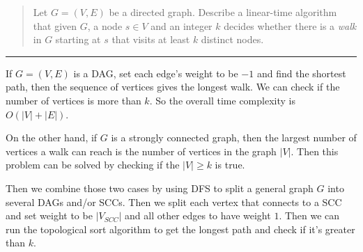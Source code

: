 \documentclass[11pt]{article}
\begin{document}



\begin{quote}
	\item Let $G=(V,E)$ be a directed graph. Describe a linear-time algorithm
that given $G$, a node $s \in V$ and an integer $k$ decides whether
there is a {\em walk} in $G$ starting at $s$ that visits at least $k$ distinct
nodes. 
\end{quote}
\hrule

\begin{solution}
	If $G = (V, E)$ is a DAG,  set each edge's weight to be $-1$ and find the shortest path, then the sequence of vertices gives the longest walk. We can check if the number of vertices is more than $k$. So the overall time complexity is $O(|V| + |E|)$.
	
	On the other hand, if $G$ is a strongly connected graph, then the largest number of vertices a walk can reach is the number of vertices in the graph $|V|$. Then this problem can be solved by checking if the $|V| \geq k$ is true.
	
	Then we combine those two cases by using DFS to split a general graph $G$ into several DAGs and/or SCCs. Then we split each vertex that connects to a SCC and set weight to be $|V_{SCC}|$ and all other edges to have weight $1$. Then we can run the topological sort algorithm to get the longest path and check if it's greater than $k$.

\end{solution}
\clearpage
\end{document}
